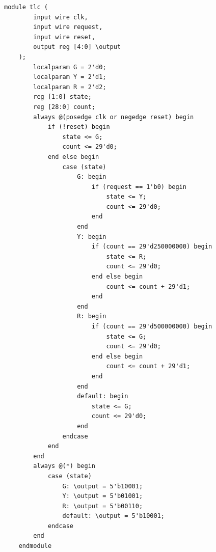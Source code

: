\documentclass[12pt]{article}
\begin{document}
\begin{lstlisting}[caption={original implementation of traffic light controller },label={list:tlc}]
    module tlc (
        input wire clk,
        input wire request,
        input wire reset,
        output reg [4:0] \output
    );
        localparam G = 2'd0;
        localparam Y = 2'd1;
        localparam R = 2'd2;
        reg [1:0] state;
        reg [28:0] count;
        always @(posedge clk or negedge reset) begin
            if (!reset) begin
                state <= G;
                count <= 29'd0;
            end else begin
                case (state)
                    G: begin
                        if (request == 1'b0) begin
                            state <= Y;
                            count <= 29'd0;
                        end
                    end
                    Y: begin
                        if (count == 29'd250000000) begin
                            state <= R;
                            count <= 29'd0;
                        end else begin
                            count <= count + 29'd1;
                        end
                    end
                    R: begin
                        if (count == 29'd500000000) begin
                            state <= G;
                            count <= 29'd0;
                        end else begin
                            count <= count + 29'd1;
                        end
                    end
                    default: begin
                        state <= G;
                        count <= 29'd0;
                    end
                endcase
            end
        end
        always @(*) begin
            case (state)
                G: \output = 5'b10001;
                Y: \output = 5'b01001;
                R: \output = 5'b00110;
                default: \output = 5'b10001;
            endcase
        end
    endmodule
\end{lstlisting}
\end{document}
